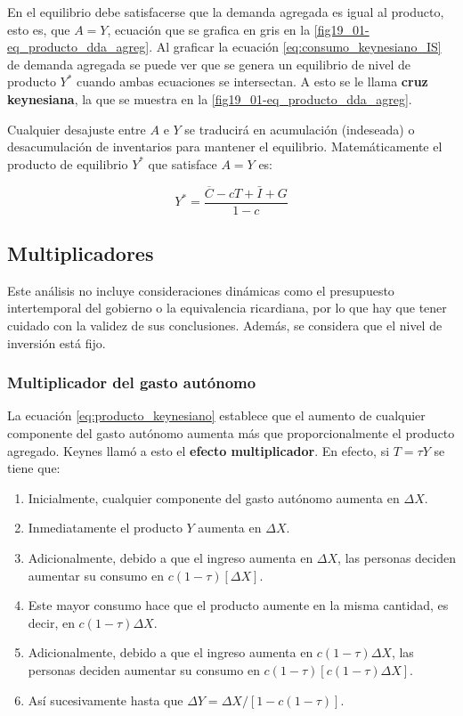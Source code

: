 \documentclass[DeGregorioResumen]{subfiles}
\begin{document}
En el equilibrio debe satisfacerse que la demanda agregada es igual al producto, esto es, que $A=Y$, ecuación que se grafica en gris en la \autoref{fig19_01-eq_producto_dda_agreg}. Al graficar la ecuación \eqref{eq:consumo_keynesiano_IS} de demanda agregada se puede ver que se genera un equilibrio de nivel de producto $Y^*$ cuando ambas ecuaciones se intersectan. A esto se le llama \textbf{cruz keynesiana}, la que se muestra en la \autoref{fig19_01-eq_producto_dda_agreg}.



Cualquier desajuste entre $A$ e $Y$ se traducirá en acumulación (indeseada) o desacumulación de inventarios para mantener el equilibrio. Matemáticamente el producto de equilibrio $Y^*$ que satisface $A=Y$ es:

\begin{equation}
Y^* = \frac{\overline{C}-cT+\bar{I}+G}{1-c}
\label{eq:producto_keynesiano}
\end{equation}

\subsection{Multiplicadores}

Este análisis no incluye consideraciones dinámicas como el presupuesto intertemporal del gobierno o la equivalencia ricardiana, por lo que hay que tener cuidado con la validez de sus conclusiones. Además, se considera  que el nivel de inversión está fijo.

\subsubsection{Multiplicador del gasto autónomo}

La ecuación \eqref{eq:producto_keynesiano} establece que el aumento de cualquier componente del gasto autónomo aumenta más que proporcionalmente el producto agregado. Keynes llamó a esto el \textbf{efecto multiplicador}. En efecto, si $T=\tau Y$ se tiene que:

\begin{enumerate}
\item Inicialmente, cualquier componente del gasto autónomo aumenta en $\Delta X$.
\item Inmediatamente el producto $Y$ aumenta en $\Delta X$.
\item Adicionalmente, debido a que el ingreso aumenta en $\Delta X$, las personas deciden aumentar su consumo en $c(1-\tau)[\Delta X]$.
\item Este mayor consumo hace que el producto aumente en la misma cantidad, es decir, en $c(1-\tau)\Delta X$.
\item Adicionalmente, debido a que el ingreso aumenta en $c(1-\tau)\Delta X$, las personas deciden aumentar su consumo en $c(1-\tau)[c(1-\tau)\Delta X]$.
\item Así sucesivamente hasta que $\Delta Y = \Delta X/[1-c(1-\tau)]$.
\end{enumerate}
\end{document}
